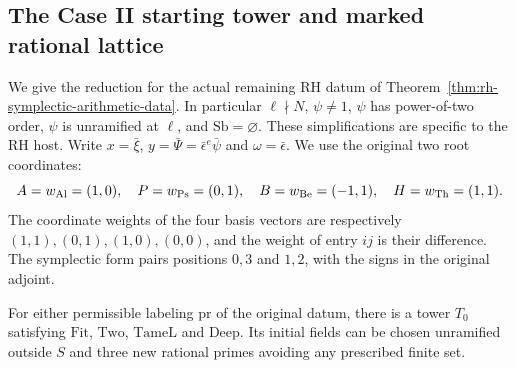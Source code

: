 \subsection{The Case II starting tower and marked rational lattice}
\label{subsec:rh-four-rational-lattice}

We give the reduction for the actual remaining RH datum of
Theorem~\ref{thm:rh-symplectic-arithmetic-data}. In particular
$\ell\nmid N$, $\psi\ne1$, $\psi$ has power-of-two order,
$\psi$ is unramified at $\ell$, and $\mathrm{Sb}=\varnothing$.
These simplifications are specific to the RH host. Write
$x=\bar\xi$, $y=\bar\Psi=\bar\epsilon^e\bar\psi$ and
$\omega=\bar\epsilon$. We use the original two root coordinates:
\[
 A=w_{\rm Al}=(1,0),\quad P=w_{\rm Ps}=(0,1),
 \quad B=w_{\rm Be}=(-1,1),\quad H=w_{\rm Th}=(1,1).
\]
The coordinate weights of the four basis vectors are respectively
$(1,1),(0,1),(1,0),(0,0)$, and the weight of entry $ij$ is their
difference. The symplectic form pairs positions $0,3$ and $1,2$,
with the signs in the original adjoint.

\begin{lemma}
\label{lem:rh-four-tame-start}
For either permissible labeling $\mathrm{pr}$ of the original
datum, there is a tower $T_0$ satisfying $\mathrm{Fit}$,
$\mathrm{Two}$, $\mathrm{TameL}$ and $\mathrm{Deep}$.
Its initial fields can be chosen unramified outside $S$ and three
new rational primes avoiding any prescribed finite set.
\end{lemma}

